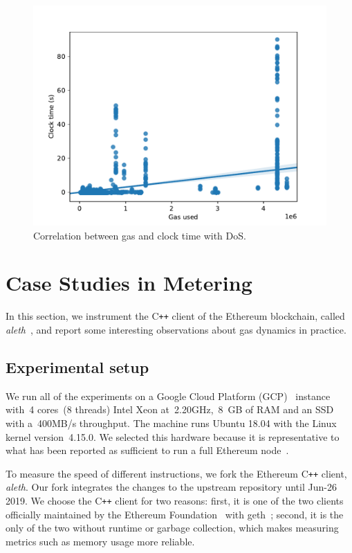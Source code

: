 \begin{figure}[tb]
  \centering\includegraphics[width=\columnwidth]{3-vm-security/figures/cpu-gas-extcodesize.pdf}
  \caption{Correlation between gas and clock time with DoS.}
  \label{fig:extcodesize-cpu}
\end{figure}

\section{Case Studies in Metering}
\label{sec:case-studies}

In this section, we instrument the C\texttt{++} client of the Ethereum blockchain, called \textit{aleth}~\cite{aleth}, and report some interesting observations about gas dynamics in practice.

\subsection{Experimental setup}
 We run all of the experiments on a Google Cloud Platform (GCP)~\cite{gcp-compute-engine} instance with~4 cores~(8 threads) Intel Xeon at~2.20GHz,~8~GB of RAM and an SSD with a~400MB/s throughput. The machine runs Ubuntu 18.04 with the Linux kernel version~4.15.0. We selected this hardware because it is representative to what has been reported as sufficient to run a full Ethereum node~\cite{node-incentive,pantheon-system-requirements,eth-hardware-requirements}.

 To measure the speed of different instructions, we fork the Ethereum C\texttt{++} client, \textit{aleth}. Our fork integrates the changes to the upstream repository until Jun-26 2019. We choose the C\texttt{++} client for two reasons: first, it is one of the two clients officially maintained by the Ethereum Foundation~\cite{ethereum-foundation-github} with geth~\cite{geth}; second, it is the only of the two without runtime or garbage collection, which makes measuring metrics such as memory usage more reliable.


